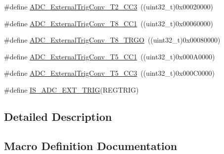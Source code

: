 \begin{DoxyCompactItemize}
\item 
\#define \hyperlink{group___a_d_c__external__trigger__sources__for__regular__channels__conversion_ga16ae1b335f2c2b4facf3d4bedc2ce27f}{A\+D\+C\+\_\+\+External\+Trig\+Conv\+\_\+\+T2\+\_\+\+C\+C3}~((uint32\+\_\+t)0x00020000)
\item 
\#define \hyperlink{group___a_d_c__external__trigger__sources__for__regular__channels__conversion_ga97af875d12e77a67e84f3aaf1f8033ed}{A\+D\+C\+\_\+\+External\+Trig\+Conv\+\_\+\+T8\+\_\+\+C\+C1}~((uint32\+\_\+t)0x00060000)
\item 
\#define \hyperlink{group___a_d_c__external__trigger__sources__for__regular__channels__conversion_gab26d94590d47ae6ec46841652741abf3}{A\+D\+C\+\_\+\+External\+Trig\+Conv\+\_\+\+T8\+\_\+\+T\+R\+GO}~((uint32\+\_\+t)0x00080000)
\item 
\#define \hyperlink{group___a_d_c__external__trigger__sources__for__regular__channels__conversion_ga6bd1ad69cb455afeabf6759b640378d3}{A\+D\+C\+\_\+\+External\+Trig\+Conv\+\_\+\+T5\+\_\+\+C\+C1}~((uint32\+\_\+t)0x000\+A0000)
\item 
\#define \hyperlink{group___a_d_c__external__trigger__sources__for__regular__channels__conversion_ga95b58981aff35d6d5fa229925cd6315d}{A\+D\+C\+\_\+\+External\+Trig\+Conv\+\_\+\+T5\+\_\+\+C\+C3}~((uint32\+\_\+t)0x000\+C0000)
\item 
\#define \hyperlink{group___a_d_c__external__trigger__sources__for__regular__channels__conversion_gac74e6054adbedd72822cacde69105318}{I\+S\+\_\+\+A\+D\+C\+\_\+\+E\+X\+T\+\_\+\+T\+R\+IG}(R\+E\+G\+T\+R\+IG)
\end{DoxyCompactItemize}


\subsection{Detailed Description}


\subsection{Macro Definition Documentation}
\mbox{\label{group___a_d_c__external__trigger__sources__for__regular__channels__conversion_ga640de59aeac8cc3d96b6db3497975d02}} 
